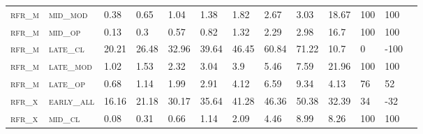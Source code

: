 \begin{landscape}
\begin{table}[!htbp]
\begin{tabular}{@{}lllllllllllll@{}}
\footnotesize \textsc{rfr\_m}      & \footnotesize \textsc{mid\_mod  }               & \footnotesize 0.38           & \footnotesize  0.65           & \footnotesize 1.04             & \footnotesize 1.38             & \footnotesize 1.82             & \footnotesize 2.67             & \footnotesize 3.03        & \footnotesize 18.67    & \footnotesize 100     & \footnotesize 100    \\
\footnotesize \textsc{rfr\_m}      & \footnotesize \textsc{mid\_op   }               & \footnotesize 0.13           & \footnotesize  0.3            & \footnotesize 0.57             & \footnotesize 0.82             & \footnotesize 1.32             & \footnotesize 2.29             & \footnotesize 2.98        & \footnotesize 16.7     & \footnotesize 100     & \footnotesize 100    \\
\footnotesize \textsc{rfr\_m}      & \footnotesize \textsc{late\_cl  }               & \footnotesize 20.21           & \footnotesize 26.48          & \footnotesize 32.96            & \footnotesize 39.64            & \footnotesize 46.45            & \footnotesize 60.84            & \footnotesize 71.22       & \footnotesize 10.7     & \footnotesize 0       & \footnotesize -100    \\
\footnotesize \textsc{rfr\_m}      & \footnotesize \textsc{late\_mod }               & \footnotesize 1.02           & \footnotesize  1.53           & \footnotesize 2.32             & \footnotesize 3.04             & \footnotesize 3.9              & \footnotesize 5.46             & \footnotesize 7.59        & \footnotesize 21.96    & \footnotesize 100     & \footnotesize 100    \\
\footnotesize \textsc{rfr\_m}      & \footnotesize \textsc{late\_op  }               & \footnotesize 0.68           & \footnotesize  1.14           & \footnotesize 1.99             & \footnotesize 2.91             & \footnotesize 4.12             & \footnotesize 6.59             & \footnotesize 9.34        & \footnotesize 4.13     & \footnotesize 76      & \footnotesize 52    \\
\footnotesize \textsc{rfr\_x}      & \footnotesize \textsc{early\_all}               & \footnotesize 16.16           & \footnotesize 21.18          & \footnotesize 30.17            & \footnotesize 35.64            & \footnotesize 41.28            & \footnotesize 46.36            & \footnotesize 50.38       & \footnotesize 32.39    & \footnotesize 34      & \footnotesize -32    \\
\footnotesize \textsc{rfr\_x}      & \footnotesize \textsc{mid\_cl   }               & \footnotesize 0.08           & \footnotesize  0.31           & \footnotesize 0.66             & \footnotesize 1.14             & \footnotesize 2.09             & \footnotesize 4.46             & \footnotesize 8.99        & \footnotesize 8.26     & \footnotesize 100     & \footnotesize 100    \\

\end{tabular}
\end{table}
\end{landscape}
